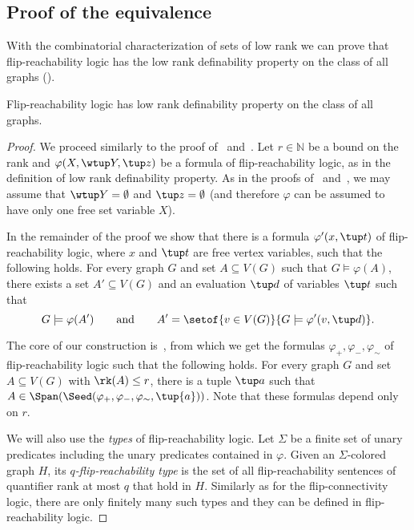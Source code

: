 \subsection{Proof of the equivalence}\label{sec:flip-reach-proof}

With the combinatorial characterization of sets of low rank we can prove that flip-reachability logic has the low rank definability property on the class of all graphs ().

\begin{lemma}
    \label{lem:low-rank-definability-freach}
    Flip-reachability logic has low rank definability property on the class of all graphs.
\end{lemma}
\begin{proof}
    We proceed similarly to the proof of~ and~.
    Let $r\in\mathbb{N}$ be a bound on the rank and $\varphi(X, \wtup Y, \tup z)$ be a formula of flip-reachability logic, as in the definition of low rank definability property. As in the proofs of~ and~, we may assume that $\wtup Y=\emptyset$ and $\tup z=\emptyset$ (and therefore $\varphi$ can be assumed to have only one free set variable $X$).

    In the remainder of the proof we show that there is a formula $\varphi'(x,\tup t)$ of flip-reachability logic, where $x$ and $\tup t$ are free vertex variables, such that the following holds.
    For every graph $G$ and set $A \subseteq V(G)$ such that $G\models \varphi(A)$, there exists a set $A'\subseteq V(G)$ and an evaluation $\tup d$ of variables $\tup t$ such that
    \[G \models \varphi(A')\qquad \textrm{and}\qquad A' = \setof{v \in V(G)}{G \models \varphi'(v, \tup d)}.\]


    The core of our construction is~, from which we get the formulas $\varphi_+, \varphi_-,\varphi_\sim$ of flip-reachability logic such that the following holds. For every graph $G$ and set $A\subseteq V(G)$ with $\rk(A)\leq r$,
    there is a tuple $\tup a$ such that $A\in \Span(\Seed(\varphi_+, \varphi_-, \varphi_{\sim}, \tup{a}))$. Note that these formulas depend only on $r$.

    We will also use the \emph{types} of flip-reachability logic.
    Let $\Sigma$ be a finite set of unary predicates including the unary predicates contained in $\varphi$.
    Given an $\Sigma$-colored graph $H$, its \emph{$q$-flip-reachability type} is the set of all flip-reachability sentences of quantifier rank at most $q$ that hold in $H$.
    Similarly as for the flip-connectivity logic, there are only finitely many such types and they can be defined in flip-reachability logic.


\end{proof}
